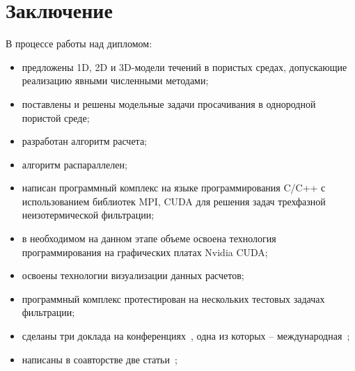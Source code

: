 \section{Заключение}

В процессе работы над дипломом:

\begin{itemize}
	\item 	предложены 1D, 2D и 3D-модели течений в пористых средах,
	допускающие реализацию явными численными методами;

	\item поставлены и решены модельные задачи просачивания в однородной 
	пористой среде;

	\item разработан алгоритм расчета;
	
	\item алгоритм распараллелен;
	
	\item написан программный комплекс на языке программирования C/C++ с использованием 
	библиотек MPI, CUDA для решения задач трехфазной неизотермической фильтрации;
	
	\item в необходимом на данном этапе объеме освоена технология 
	программирования на графических платах Nvidia CUDA;

	\item освоены технологии визуализации данных расчетов;

	\item программный комплекс протестирован на нескольких тестовых задачах 
	фильтрации;
	
	\item сделаны три доклада на конференциях~, одна из которых -- международная~;

	\item написаны в соавторстве две статьи~;
\end{itemize}
